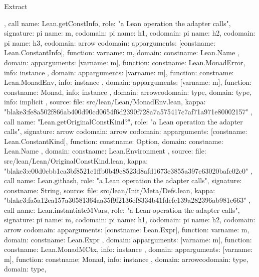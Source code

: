 \begin{lexlean}{Extract}
\begin{toolingmodule}
{{{      }
    },
    call{
      name: Lean.getConstInfo,
      role: "a Lean operation the adapter calls",
      signature: pi{
        name: m,
        codomain: pi{
          name: h1,
          codomain: pi{
            name: h2,
            codomain: pi{
              name: h3,
              codomain: arrow{
                codomain: app{arguments: [const{name: Lean.ConstantInfo}], function: var{name: m}},
                domain: const{name: Lean.Name}
              },
              domain: app{arguments: [var{name: m}], function: const{name: Lean.MonadError}},
              info: instance
            },
            domain: app{arguments: [var{name: m}], function: const{name: Lean.MonadEnv}},
            info: instance
          },
          domain: app{arguments: [var{name: m}], function: const{name: Monad}},
          info: instance
        },
        domain: arrow{codomain: type{}, domain: type{}},
        info: implicit
      },
      source: {
        file: src/lean/Lean/MonadEnv.lean,
        kappa: "blake3:fe8a502f866ab400d90cd0654f6d2390f728a7a575417c7af71a971e80002157"
      }
    },
    call{
      name: "Lean.getOriginalConstKind?",
      role: "a Lean operation the adapter calls",
      signature: arrow{
        codomain: arrow{
          codomain: app{arguments: [const{name: Lean.ConstantKind}], function: const{name: Option}},
          domain: const{name: Lean.Name}
        },
        domain: const{name: Lean.Environment}
      },
      source: {
        file: src/lean/Lean/OriginalConstKind.lean,
        kappa: "blake3:e00d0cbb1ca3bf8521e1ffb0b49c8523d8afd1673e3855a397e63020bafc02c0"
      }
    },
    call{
      name: Lean.githash,
      role: "a Lean operation the adapter calls",
      signature: const{name: String},
      source: {
        file: src/lean/Init/Meta/Defs.lean,
        kappa: "blake3:fa5a12ca157a30581364aa35f9f2136ef8334b41fdcfe139a282396ab981e663"
      }
    },
    call{
      name: Lean.instantiateMVars,
      role: "a Lean operation the adapter calls",
      signature: pi{
        name: m,
        codomain: pi{
          name: h1,
          codomain: pi{
            name: h2,
            codomain: arrow{
              codomain: app{arguments: [const{name: Lean.Expr}], function: var{name: m}},
              domain: const{name: Lean.Expr}
            },
            domain: app{arguments: [var{name: m}], function: const{name: Lean.MonadMCtx}},
            info: instance
          },
          domain: app{arguments: [var{name: m}], function: const{name: Monad}},
          info: instance
        },
        domain: arrow{codomain: type{}, domain: type{}},
}}}
\end{toolingmodule}
\end{lexlean}
